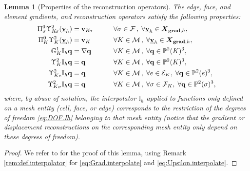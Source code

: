 \documentclass[a4paper,11pt]{article}
\newtheorem{lemma}[theorem]{Lemma}
\theoremstyle{definition}
\theoremstyle{remark}
\newcommand{\uvec}[1]{\underline{\mathbf{#1}}}
\newcommand{\bo}[1]{\mathbf{#1}}
\newcommand{\up}[1]{\Upsilon^2_{#1}}
\def\cE{\mathcal{E}}
\def\cF{\mathcal{F}}
\def\cM{\mathcal{M}}
\def\dgs{\boldsymbol{X}_{{\bf grad},h}}
\def\Ksig{{K\!\sigma}}
\begin{document}
\begin{lemma}[Properties of the reconstruction operators] \label{lem:prop.reconstructions}
The edge, face, and element gradients, and reconstruction operators satisfy the following properties:
\begin{alignat}{2}
\Pi^0_\sigma\Upsilon_{\Ksig}^2(\uvec{v}_h)&=\bo{v}_{\Ksig}&&\qquad\forall \sigma\in\cF\,,\;\forall \uvec{v}_h\in \dgs,\label{eq:Pisigma.Pot}\\
\Pi^0_K\Upsilon_{K}^2(\uvec{v}_h)&=\bo{v}_K&&\qquad\forall K\in\cM\,,\;\forall \uvec{v}_h\in \dgs,\label{eq:PiK.Pot}\\
\mathbb G_{K}^1\mathbb I_h\bo{q}&=\nabla\bo{q}&&\qquad \forall K\in\cM\,,\;\forall \bo{q}\in \mathbb P^2(K)^3,\label{eq:Grad.interpolate}\\
\Upsilon_{K}^2\mathbb I_h\bo{q}&=\bo{q}&&\qquad\forall K\in\cM\,,\;\forall \bo{q}\in \mathbb P^2(K)^3,\label{eq:Upsilon.interpolate}\\
\up{Ke}\mathbb I_h\bo{q}&=\bo{q} &&\qquad \forall K\in\cM\,,\;\forall e\in\cE_K,\;\forall \bo{q}\in \mathbb P^2(e)^3,\label{eq:Upsilon.sigma.interpolate}\\
\up{K\sigma}\mathbb I_h \bo{q}&=\bo{q}&&\qquad \forall K\in\cM\,,\; \forall \sigma\in\cF_K,\;\forall \bo{q}\in \mathbb P^2(\sigma)^3,\notag
\end{alignat}
where, by abuse of notation, the interpolator $\mathbb I_h$ applied to functions only defined on a mesh entity (cell, face, or edge) corresponds to
the restriction of the degrees of freedom \eqref{eq:DOF.Ih} belonging to that mesh entity (notice that the gradient or displacement reconstructions on the corresponding mesh entity only depend on these degrees of freedom).
\end{lemma}
\begin{proof}
We refer to \cite[Lemma 3]{pjddr} for the proof of this lemma, using Remark \ref{rem:def.interpolator} for \eqref{eq:Grad.interpolate} and \eqref{eq:Upsilon.interpolate}.
\end{proof}
\end{document}
